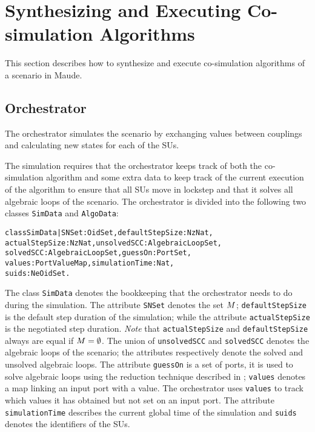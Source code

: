 \section{Synthesizing and Executing Co-simulation Algorithms}\label{sc:synthesize}
This section describes how to synthesize and execute co-simulation algorithms of a scenario in Maude.

\subsection{Orchestrator}
The orchestrator simulates the scenario by exchanging values between couplings and calculating new states for each of the SUs.

The simulation requires that the orchestrator keeps track of both the co-simulation algorithm and some extra data to keep track of the current execution of the algorithm to ensure that all SUs move in lockstep and that it solves all algebraic loops of the scenario.
The orchestrator is divided into the following two classes \texttt{SimData} and \texttt{AlgoData}:
\small
\begin{alltt}
class SimData | SNSet : OidSet,           defaultStepSize : NzNat,
          actualStepSize : NzNat,         unsolvedSCC : AlgebraicLoopSet, 
          solvedSCC : AlgebraicLoopSet,   guessOn : PortSet,
          values : PortValueMap,          simulationTime : Nat,
          suids : NeOidSet .
\end{alltt}
\normalfont
The class \texttt{SimData} denotes the bookkeeping that the orchestrator needs to do during the simulation.
The attribute \texttt{SNSet} denotes the set $M$; \texttt{defaultStepSize} is the default step duration of the simulation; while the attribute \texttt{actualStepSize} is the negotiated step duration.
\emph{Note} that \texttt{actualStepSize} and \texttt{defaultStepSize} always are equal if $M = \emptyset$.
The union of \texttt{unsolvedSCC} and \texttt{solvedSCC} denotes the algebraic loops of the scenario; the attributes respectively denote the solved and unsolved algebraic loops.
The attribute \texttt{guessOn} is a set of ports, it is used to solve algebraic loops using the reduction technique described in \cite{thrane2021}; \texttt{values} denotes a map linking an input port with a value. 
The orchestrator uses \texttt{values} to track which values it has obtained but not set on an input port. 
The attribute \texttt{simulationTime} describes the current global time of the simulation and \texttt{suids} denotes the identifiers of the SUs.

